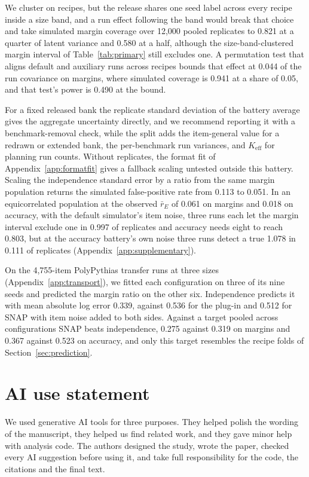 We cluster on recipes, but the release shares one seed label across every recipe inside a size band, and a run effect following the band would break that choice and take simulated margin coverage over 12,000 pooled replicates to 0.821 at a quarter of latent variance and 0.580 at a half, although the size-band-clustered margin interval  of Table~\ref{tab:primary} still excludes one. A permutation test that aligns default and auxiliary runs across recipes bounds that effect at 0.044 of the run covariance on margins, where simulated coverage is 0.941 at a share of 0.05, and that test's power is 0.490 at the bound.

For a fixed released bank the replicate standard deviation of the battery average gives the aggregate uncertainty directly, and we recommend reporting it with a benchmark-removal check, while the split adds the item-general value for a redrawn or extended bank, the per-benchmark run variances, and $K_{\mathrm{eff}}$ for planning run counts. Without replicates, the format fit of Appendix~\ref{app:formatfit} gives a fallback scaling untested outside this battery. Scaling the independence standard error by a ratio from the same margin population returns the simulated false-positive rate from 0.113 to 0.051. In an equicorrelated population at the observed $\bar r_E$ of 0.061 on margins and 0.018 on accuracy, with the default simulator's item noise, three runs each let the margin interval exclude one in 0.997 of replicates and accuracy needs eight to reach 0.803, but at the accuracy battery's own noise three runs detect a true 1.078 in 0.111 of replicates (Appendix~\ref{app:supplementary}).

On the 4,755-item PolyPythias transfer runs at three sizes (Appendix~\ref{app:transport}), we fitted each configuration on three of its nine seeds and predicted the margin ratio on the other six. Independence predicts it with mean absolute log error 0.339, against 0.536 for the plug-in and 0.512 for SNAP with item noise added to both sides. Against a target pooled across configurations SNAP beats independence, 0.275 against 0.319 on margins and 0.367 against 0.523 on accuracy, and only this target resembles the recipe folds of Section~\ref{sec:prediction}.

\label{maintext:end}
\section*{AI use statement}
We used generative AI tools for three purposes. They helped polish the wording of the manuscript, they helped us find related work, and they gave minor help with analysis code. The authors designed the study, wrote the paper, checked every AI suggestion before using it, and take full responsibility for the code, the citations and the final text.

